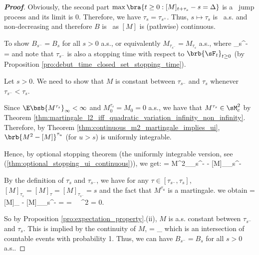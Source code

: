 \begin{proof}[\bf Proof]
Obviously, the second part $\max\bra{t\geq 0:[M]_{t+\tau_s} - s = \Delta}$ is a \cadlag\ jump process and its limit is 0. Therefore, we have %
$\tau_s = \tau_{s^+}$. Thus, $s \mapsto \tau_s$ is \cadlag\ a.s. and non-decreasing and therefore $B$ is \cadlag\ as $[M]$ is (pathwise) continuous.

To show $B_{s^-} = B_s$ for all $s > 0$ a.s., or equivalently $M_{\tau_{s^-}} = M_{\tau_s}$ a.s., where
\be
\tau_{s^-} = \inf{}
\ee
and note that $\tau_{s^-}$ is also a stopping time with respect to $\brb{\sF_t}_{t\geq 0}$ (by Proposition \ref{pro:debut_time_closed_set_stopping_time}).

Let $s > 0$. We need to show that $M$ is constant between $\tau_{s^-}$ and $\tau_s$ whenever $\tau_{s^-} < \tau_s$. %

Since $\E\bsb{M^{\tau_s}}_\infty < \infty$ and $M^{\tau_s}_0 = M_0 = 0$ a.s., we have that $M^{\tau_s} \in \sM_c^2$ by Theorem \ref{thm:martingale_l2_iff_quadratic_variation_infinity_non_infinity}.
Therefore, by Theorem \ref{thm:continuous_m2_martingale_implies_ui}, $\brb{M^2 - [M]}^{\tau_u}$ (for $u>s$) is uniformly integrable.

Hence, by optional stopping theorem (the uniformly integrable version, see (\ref{thm:optional_stopping_ui_continuous})), we get:
\be
\E{} = M^2_{\tau_{s^-}} - [M]_{\tau_{s^-}}\quad {}
\ee

By the definition of $\tau_s$ and $\tau_{s^-}$, we have for any $\tau\in [\tau_{s^-}, \tau_s]$, $[M]_{\tau_s} = [M]_{\tau} = [M]_{\tau_{s^-}} = s$
and the fact that $M^{\tau_u}$ is a martingale. %
we obtain
 =[M]_{\tau} - [M]_{\tau_{s^-}} = \E{} = \E{} \ \ra \ \E{}^2 = 0.
\ee

So by Proposition \ref{pro:expectation_property}.(ii), $M$ is a.s. constant between $\tau_{s^-}$ and $\tau_s$. This is implied by the continuity of $M$,
\be
{} = \bigcap_{\tau\in \Q{}}
\ee
which is an intersection of countable events with probability 1. Thus, we can have $B_{s^-} = B_s$ for all $s > 0$ a.s..


\end{proof}
